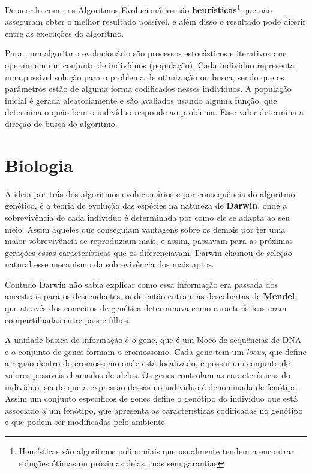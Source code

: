 De acordo com \citeauthor{Linden2008}, os Algoritmos Evolucionários são \textbf{heurísticas}\footnote{Heurísticas são algoritmos polinomiais que usualmente tendem a encontrar soluções ótimas ou próximas delas, mas sem garantias} que não asseguram obter o melhor resultado possível, e além disso o resultado pode diferir entre as execuções do algoritmo.

Para \citeauthor{Sivanandam2007}, um algoritmo evolucionário são processos estocásticos e iterativos que operam em um conjunto de indivíduos (população). Cada individuo representa uma possível solução para o problema de otimização ou busca, sendo que os parâmetros estão de alguma forma codificados nesses indivíduos. A população inicial é gerada aleatoriamente e são avaliados usando alguma função, que determina o quão bem o indivíduo responde ao problema. Esse valor determina a direção de busca do algoritmo. 

\section{Biologia}
A ideia por trás dos algoritmos evolucionários e por consequência do algoritmo genético, é a teoria de evolução das espécies na natureza de \textbf{Darwin}, onde a sobrevivência de cada indivíduo é determinada por como ele se adapta ao seu meio. Assim aqueles que conseguiam vantagens sobre os demais por ter uma maior sobrevivência se reproduziam mais, e assim, passavam para as próximas gerações essas características que os diferenciavam. Darwin chamou de seleção natural esse mecanismo da sobrevivência dos mais aptos.

Contudo Darwin não sabia explicar como essa informação era passada dos ancestrais para os descendentes, onde então entram as descobertas de \textbf{Mendel}, que através dos conceitos de genética determinava como características eram compartilhadas entre pais e filhos. 

A unidade básica de informação é o gene, que é um bloco de sequências de DNA e o conjunto de genes formam o cromossomo. Cada gene tem um \textit{locus}, que define a região dentro do cromossomo onde está localizado, e possui um conjunto de valores possíveis chamados de alelos. Os genes controlam as características do indivíduo, sendo que a expressão dessas no individuo é denominada de fenótipo. Assim um conjunto específicos de genes define o genótipo do indivíduo que está associado a um fenótipo, que apresenta as características codificadas no genótipo e que podem ser modificadas pelo ambiente. 

